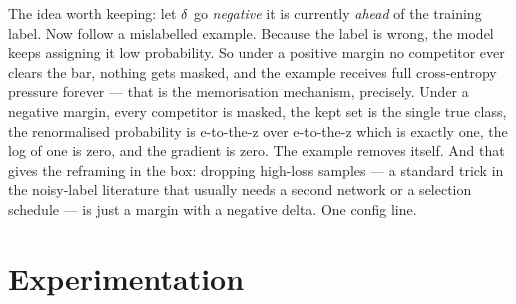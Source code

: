 \begin{frame}{The idea worth keeping: let $\delta$ go \emph{negative}}
{    it is currently \emph{ahead} of the training label. Now follow a mislabelled
    example. Because the label is wrong, the model keeps assigning it low
    probability. So under a positive margin no competitor ever clears the bar,
    nothing gets masked, and the example receives full cross-entropy pressure
    forever --- that is the memorisation mechanism, precisely. Under a negative
    margin, every competitor is masked, the kept set is the single true class,
    the renormalised probability is e-to-the-z over e-to-the-z which is exactly
    one, the log of one is zero, and the gradient is zero. The example removes
    itself. And that gives the reframing in the box: dropping high-loss samples
    --- a standard trick in the noisy-label literature that usually needs a
    second network or a selection schedule --- is just a margin with a negative
    delta. One config line.%
  }
\end{frame}

\section{Experimentation}


